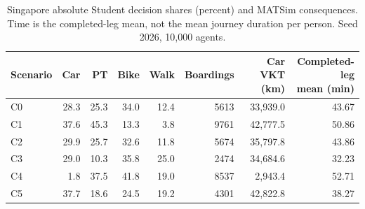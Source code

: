 \begin{table}[pos=htbp]
\centering\small
\setlength{\tabcolsep}{3pt}
\caption{Singapore absolute Student decision shares (percent) and MATSim consequences. Time is the completed-leg mean, not the mean journey duration per person. Seed 2026, 10,000 agents.}
\label{tab:singapore}
\begin{tabular}{@{}lrrrrrrr@{}}
\toprule
Scenario & Car & PT & Bike & Walk & Boardings & Car VKT (km) & \shortstack{Completed-leg\\mean (min)} \\
\midrule
C0 & 28.3 & 25.3 & 34.0 & 12.4 & 5613 & 33,939.0 & 43.67 \\
C1 & 37.6 & 45.3 & 13.3 & 3.8 & 9761 & 42,777.5 & 50.86 \\
C2 & 29.9 & 25.7 & 32.6 & 11.8 & 5674 & 35,797.8 & 43.86 \\
C3 & 29.0 & 10.3 & 35.8 & 25.0 & 2474 & 34,684.6 & 32.23 \\
C4 & 1.8 & 37.5 & 41.8 & 19.0 & 8537 & 2,943.4 & 52.71 \\
C5 & 37.7 & 18.6 & 24.5 & 19.2 & 4301 & 42,822.8 & 38.27 \\
\bottomrule
\end{tabular}
\end{table}
